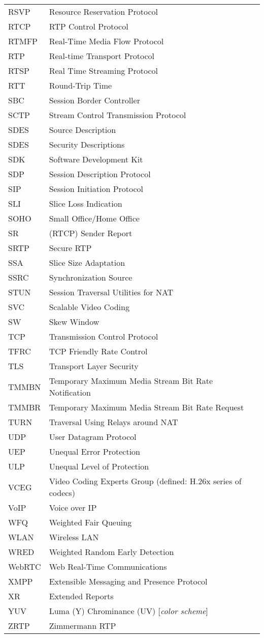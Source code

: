 \begin{longtable}{ll}
RSVP 	& Resource Reservation Protocol \\
RTCP 	& RTP Control Protocol \\
RTMFP	& Real-Time Media Flow Protocol \\
RTP 	& Real-time Transport Protocol \\
RTSP 	& Real Time Streaming Protocol \\
RTT 	& Round-Trip Time \\
SBC  	& Session Border Controller \\
SCTP 	& Stream Control Transmission Protocol \\
SDES 	& Source Description \\
SDES 	& Security Descriptions \\
SDK  	& Software Development Kit \\
SDP 	& Session Description Protocol \\
SIP 	& Session Initiation Protocol \\
SLI 	& Slice Loss Indication \\
SOHO 	& Small Office/Home Office \\
SR  	& (RTCP) Sender Report \\
SRTP 	& Secure RTP \\
SSA 	& Slice Size Adaptation \\
SSRC 	& Synchronization Source \\
STUN 	& Session Traversal Utilities for NAT \\
SVC 	& Scalable Video Coding \\
SW  	& Skew Window \\
TCP 	& Transmission Control Protocol \\
TFRC 	& TCP Friendly Rate Control \\
TLS 	& Transport Layer Security \\
TMMBN 	& Temporary Maximum Media Stream Bit Rate Notification \\
TMMBR 	& Temporary Maximum Media Stream Bit Rate Request \\
TURN 	& Traversal Using Relays around NAT \\
UDP 	& User Datagram Protocol \\
UEP 	& Unequal Error Protection \\
ULP 	& Unequal Level of Protection \\
VCEG 	& Video Coding Experts Group (defined: H.26x series of codecs)\\
VoIP 	& Voice over IP \\
WFQ 	& Weighted Fair Queuing \\
WLAN	& Wireless LAN \\
WRED 	& Weighted Random Early Detection \\
WebRTC	& Web Real-Time Communications \\
XMPP 	& Extensible Messaging and Presence Protocol \\
XR  	& Extended Reports \\
YUV 	& Luma (Y) Chrominance (UV) [\textit{color scheme}] \\
ZRTP 	& Zimmermann RTP \\
\end{longtable}
